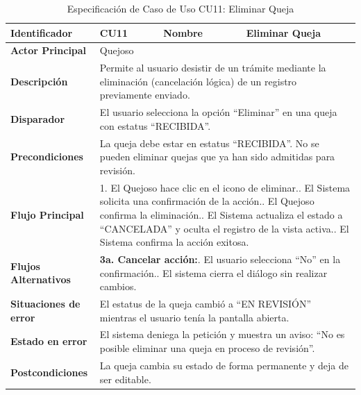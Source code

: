 \vspace{0.8cm}

\begingroup
\setlength{\parskip}{0pt}
\begin{longtable}{|p{3.5cm}|p{2cm}|p{2.5cm}|p{7cm}|}
\caption{Especificación de Caso de Uso CU11: Eliminar Queja}
\label{tab:cu11_eliminar_queja} \\
\hline
\textbf{Identificador} & CU11 & \textbf{Nombre} & Eliminar Queja \\ \hline
\textbf{Actor Principal} & \multicolumn{3}{p{11.5cm}|}{Quejoso} \\ \hline
\textbf{Descripción} & \multicolumn{3}{p{11.5cm}|}{Permite al usuario desistir de un trámite mediante la eliminación (cancelación lógica) de un registro previamente enviado.} \\ \hline
\textbf{Disparador} & \multicolumn{3}{p{11.5cm}|}{El usuario selecciona la opción ``Eliminar'' en una queja con estatus ``RECIBIDA''.} \\ \hline
\textbf{Precondiciones} & \multicolumn{3}{p{11.5cm}|}{La queja debe estar en estatus ``RECIBIDA''. No se pueden eliminar quejas que ya han sido admitidas para revisión.} \\ \hline
\textbf{Flujo Principal} & \multicolumn{3}{p{11.5cm}|}{1. El Quejoso hace clic en el icono de eliminar.\newline 2. El Sistema solicita una confirmación de la acción.\newline 3. El Quejoso confirma la eliminación.\newline 4. El Sistema actualiza el estado a ``CANCELADA'' y oculta el registro de la vista activa.\newline 5. El Sistema confirma la acción exitosa.} \\ \hline
\textbf{Flujos Alternativos} & \multicolumn{3}{p{11.5cm}|}{\textbf{3a. Cancelar acción:}\newline 1. El usuario selecciona ``No'' en la confirmación.\newline 2. El sistema cierra el diálogo sin realizar cambios.} \\ \hline
\textbf{Situaciones de error} & \multicolumn{3}{p{11.5cm}|}{El estatus de la queja cambió a ``EN REVISIÓN'' mientras el usuario tenía la pantalla abierta.} \\ \hline
\textbf{Estado en error} & \multicolumn{3}{p{11.5cm}|}{El sistema deniega la petición y muestra un aviso: ``No es posible eliminar una queja en proceso de revisión''.} \\ \hline
\textbf{Postcondiciones} & \multicolumn{3}{p{11.5cm}|}{La queja cambia su estado de forma permanente y deja de ser editable.} \\ \hline
\end{longtable}
\endgroup

